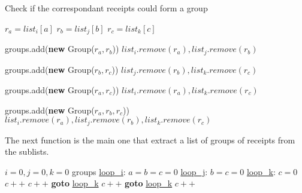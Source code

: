\begin{algorithm}[H]
\caption{Check if the correspondant receipts could form a group}
\begin{algorithmic}[1]

\State $r_{a} = list_{i}[a]$
\State $r_{b} = list_{j}[b]$
\State $r_{c} = list_{k}[c]$

	\State groups.add(\textbf{new} Group($r_a, r_b$))
	\State $list_i.remove(r_a), list_j.remove(r_b)$
	\State {}
\EndIf

	\State groups.add(\textbf{new} Group($r_b, r_c$))
	\State $list_j.remove(r_b), list_k.remove(r_c)$
	\State {}
\EndIf

	\State groups.add(\textbf{new} Group($r_a, r_c$))
	\State $list_i.remove(r_a), list_k.remove(r_c)$
	\State {}
\EndIf

	\State groups.add(\textbf{new} Group($r_a, r_b, r_c$))
	\State $list_i.remove(r_a), list_j.remove(r_b), list_k.remove(r_c)$
	\State {}
\EndIf

\EndFunction
\end{algorithmic}
\end{algorithm}

The next function is the main one that extract a list of groups of receipts from the sublists.

\begin{algorithm}[H]
\caption{}
\begin{algorithmic}[1]
\State $i=0, j=0, k=0$
\State groups
\State \underline{loop\_i}:
	\State $a=b=c=0$
	\State \underline{loop\_j}:
		\State $b=c=0$
		\State \underline{loop\_k}:
			\State $c=0$
									\State $c++$
								\EndIf
							\Else
								\State $c++$
							\EndIf
						\Else
							\State \textbf{goto} \underline{loop\_k}
						\EndIf
					\Else %
									\State $c++$
								\EndIf
							\Else
								\State \textbf{goto} \underline{loop\_k}
							\EndIf						
						\Else
								\State $c++$
							\EndIf
						\EndIf
					\EndIf
				\Else %
				\end{algorithmic}
				\end{algorithm}
				
